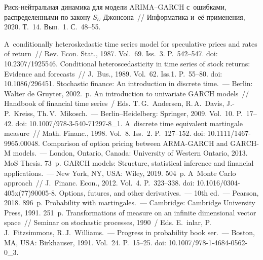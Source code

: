 \begin{multicols}{2}
{{\begin{thebibliography}{99}
 Риск-нейт\-раль\-ная динамика для модели 
ARIMA--GARCH с~ошиб\-ка\-ми, распределенными по закону $S_U$ Джонсона~// 
Информатика и~её применения, 2020. Т.~14. Вып.~1. С.~48--55.

 A~conditionally heteroskedastic time series model for speculative prices and 
rates of return~//  Rev. Econ. Stat., 1987. Vol.~69. Iss.~3. P.~542--547. doi: 10.2307/1925546.
 Conditional heteroscedasticity in time series of stock returns: Evidence and 
forecasts~// J.~Bus., 1989. Vol.~62. Iss.1. P.~55--80. doi: 10.1086/296451.
 Stochastic finance: An introduction in discrete time.~--- Berlin: 
Walter de Gruyter, 2002.~p.
 An introduction to univariate GARCH models~//  Handbook of 
financial time series~/
Eds. T.\,G.~Andersen, R.\,A.~Davis, J.-P.~Kreiss, Th.\,V.~Mikosch.~--- Berlin--Heidelberg: 
Springer, 2009. Vol.~10.  
P.~17--42. doi: 10.1007/978-3-540-71297-8\_1.
 A~discrete time equivalent martingale measure~// Math. 
Financ., 1998. Vol.~8. Iss.~2. P.~127--152. doi: 10.1111/1467-9965.00048.
 Comparison of option pricing between ARMA-GARCH and GARCH-M models.~--- 
London, Ontario, Canada: University of Western Ontario, 2013. MoS Thesis. 73~p.
 GARCH models: Structure, statistical inference and financial 
applications.~--- New York, NY, USA: Wiley, 2019. 504~p.
 A~Monte Carlo approach~// J.~Financ. Econ., 2012. Vol.~4. P.~323--338. 
doi: 10.1016/0304-405x(77)90005-8.
 Options, futures, and other derivatives.~--- 10th ed.~--- Pearson, 2018. 896~p.
 Probability with martingales.~--- Cambridge: Cambridge University Press, 
1991. 251~p.
 Transformations of measure on an infinite dimensional vector space~// Seminar on 
stochastic processes, 1990~/ Eds. \mbox{E.~{}inlar}, P.\,J.~Fitzsimmons, 
R.\,J.~Williams.~--- Progress in probability book ser.~--- Boston, MA, USA:
Birkh$\ddot{\mbox{a}}$user, 1991. 
Vol.~24. P.~15--25. doi: 10.1007/978-1-4684-0562-0\_3.
\end{thebibliography}

 }
 }

\end{multicols}

